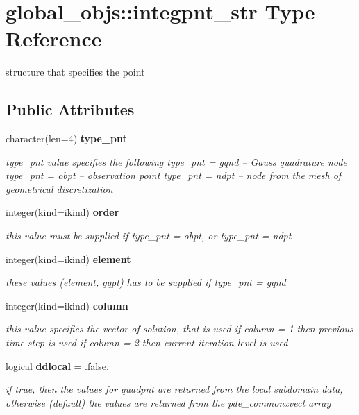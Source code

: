 \section{global\+\_\+objs\+:\+:integpnt\+\_\+str Type Reference}
\label{structglobal__objs_1_1integpnt__str}


structure that specifies the point  


\subsection*{Public Attributes}
\begin{DoxyCompactItemize}
\item 
character(len=4) {\bf type\+\_\+pnt}
\begin{DoxyCompactList}\small\item\em type\+\_\+pnt value specifies the following type\+\_\+pnt = gqnd -- Gauss quadrature node type\+\_\+pnt = obpt -- observation point type\+\_\+pnt = ndpt -- node from the mesh of geometrical discretization \end{DoxyCompactList}\item 
integer(kind=ikind) {\bf order}
\begin{DoxyCompactList}\small\item\em this value must be supplied if type\+\_\+pnt = obpt, or type\+\_\+pnt = ndpt \end{DoxyCompactList}\item 
integer(kind=ikind) {\bf element}
\begin{DoxyCompactList}\small\item\em these values (element, gqpt) has to be supplied if type\+\_\+pnt = gqnd \end{DoxyCompactList}\item 
integer(kind=ikind) {\bf column}
\begin{DoxyCompactList}\small\item\em this value specifies the vector of solution, that is used if column = 1 then previous time step is used if column = 2 then current iteration level is used \end{DoxyCompactList}\item 
logical {\bf ddlocal} = .false.
\begin{DoxyCompactList}\small\item\em if true, then the values for quadpnt are returned from the local subdomain data, otherwise (default) the values are returned from the pde\+\_\+commonxvect array \end{DoxyCompactList}\item 

\end{DoxyCompactItemize}

